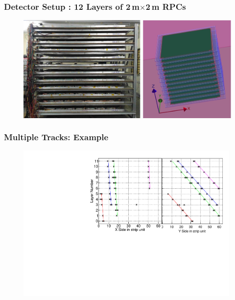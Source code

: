 \documentclass{beamer}
\begin{document}
\begin{frame}
  \frametitle{Detector Setup : 12 Layers of 2\,m$\times$2\,m RPCs}
  \begin{figure}[h]
    \centering
    \includegraphics[width=0.99\linewidth]{ABlockStackiDAQ_new.jpg} 
  \end{figure}
\end{frame}

\begin{frame}
  \frametitle{Multiple Tracks: Example}
  \begin{figure}[!h]
    \includegraphics[width=0.99\textwidth]{Multi_Event_20170831_021424_386176_m4_1.pdf}
  \end{figure}
\end{frame}
\end{document}
